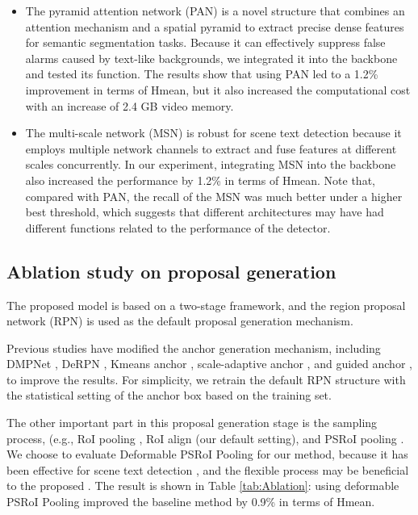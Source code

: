 \begin{itemize}
  \item The pyramid attention network (PAN) \cite{huang2019mask} is a novel structure that combines an attention mechanism and a spatial pyramid to extract precise dense features for semantic segmentation tasks. Because it can effectively suppress false alarms caused by text-like backgrounds, we integrated it into the backbone and tested its function. The results show that using PAN led to a 1.2\% improvement in terms of Hmean, but it also increased the computational cost with an increase of 2.4 GB video memory.
  \item The multi-scale network (MSN) \cite{xue2019msr} is robust for scene text detection because it employs multiple network channels to extract and fuse features at different scales concurrently. In our experiment, integrating MSN into the backbone also increased the performance by 1.2\% in terms of Hmean. Note that, compared with PAN, the recall of the MSN was much better under a higher best threshold, which suggests that different architectures may have had different functions related to the performance of the detector.
\end{itemize}





\subsection{Ablation study on proposal generation}
The proposed model is based on a two-stage framework, and the region proposal network (RPN) \cite{ren2015faster} is used as the default proposal generation mechanism. 

Previous studies have modified the anchor generation mechanism, including DMPNet \cite{liu2017deep}, DeRPN \cite{xie2018derpn}, Kmeans anchor \cite{redmon2017yolo9000}, scale-adaptive anchor \cite{li2019scale}, and guided anchor \cite{wang2019region}, to improve the results. For simplicity, we retrain  the default RPN structure with the statistical setting of the anchor box based on the training set. 

The other important part in this proposal generation stage is the sampling process, (e.g., RoI pooling \cite{ren2015faster}, RoI align \cite{he2017mask} (our default setting), and PSRoI pooling \cite{dai2016r}. We choose to evaluate Deformable PSRoI Pooling \cite{dai2017deformable} for our method, because it has been effective for scene text detection \cite{yang2018inceptext}, and the flexible process may be beneficial to the proposed \Ours. The result is shown in Table \ref{tab:Ablation}: using deformable PSRoI Pooling improved the baseline method by 0.9\% in terms of Hmean.

